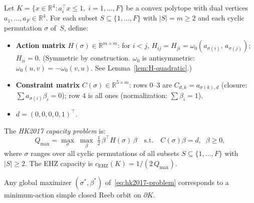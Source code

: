 \begin{definition}\label{def:hk2017-problem}
Let $K = \{x \in \mathbb{R}^4 : a_i^\top x \leq 1,\; i = 1,\ldots,F\}$
be a convex polytope with dual vertices
$a_1, \ldots, a_F \in \mathbb{R}^4$.
For each subset $S \subseteq \{1, \ldots, F\}$ with $|S| = m \geq 2$
and each cyclic permutation $\sigma$ of~$S$, define:
\begin{itemize}
  \item \textbf{Action matrix}
    $H(\sigma) \in \mathbb{R}^{m \times m}$:
    for $i < j$,\;
    $H_{ij} = H_{ji} = \omega_0(a_{\sigma(i)},\, a_{\sigma(j)})$;\;
    $H_{ii} = 0$.
    (Symmetric by construction.
    $\omega_0$ is antisymmetric: $\omega_0(u, v) = -\omega_0(v, u)$.
    See Lemma~\ref{lem:H-quadratic}.)
  \item \textbf{Constraint matrix}
    $C(\sigma) \in \mathbb{R}^{5 \times m}$:
    rows $0$--$3$ are $C_{d,k} = a_{\sigma(k),d}$
    (closure: $\sum a_{\sigma(i)} \beta_i = 0$);
    row $4$ is all ones
    (normalization: $\sum \beta_i = 1$).
  \item $d = (0, 0, 0, 0, 1)^\top$.
\end{itemize}
The \emph{HK2017 capacity problem} is:
\begin{equation}\label{eq:hk2017-problem}
  Q_{\max}
  = \max_{\sigma}\;
    \max_{\beta}\;
    \tfrac{1}{2}\,\beta^\top H(\sigma)\, \beta
  \quad \text{s.t.} \quad
  C(\sigma)\beta = d, \;\; \beta \geq 0,
\end{equation}
where $\sigma$ ranges over all cyclic permutations of all subsets
$S \subseteq \{1, \ldots, F\}$ with $|S| \geq 2$.
The EHZ capacity is $c_{\mathrm{EHZ}}(K) = 1/(2\, Q_{\max})$.
\end{definition}

\begin{fact}[HK2017]\label{fact:hk2017}
Any global maximizer $(\sigma^*, \beta^*)$
of~\eqref{eq:hk2017-problem}
corresponds to a minimum-action simple closed Reeb orbit on
$\partial K$.
\end{fact}



